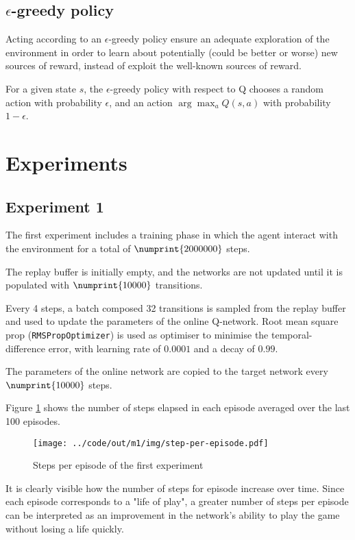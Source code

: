 \documentclass[a4paper,12pt]{article} %
\begin{document}
	\subsection*{$\epsilon$-greedy policy}
	
	Acting according to an $\epsilon$-greedy policy ensure an adequate exploration of the environment in order to learn about potentially (could be better or worse) new sources of reward, instead of exploit the well-known sources of reward.
	
	For a given state $s$, the $\epsilon$-greedy policy with respect to Q chooses a random action with probability $\epsilon$, and an action $\arg \max_a Q(s, a)$ with probability $1 - \epsilon$.
	
	\section{Experiments}
	\subsection*{Experiment 1}
	The first experiment includes a training phase in which the agent interact with the environment for a total of $\numprint{2000000}$ steps.
	
	The replay buffer is initially empty, and the networks are not updated until it is populated with $\numprint{10000}$ transitions. 
	
	Every 4 steps, a batch composed 32 transitions is sampled from the replay buffer and used to update the parameters of the online Q-network.
	Root mean square prop (\texttt{RMSPropOptimizer}) is used as optimiser to minimise the temporal-difference error, with learning rate of ${0.0001}$ and a decay of $0.99$. 
	
	The parameters of the online network are copied to the target network every $\numprint{10000}$ steps.
	\bigskip

	Figure \ref{fig:step-m1} shows the number of steps elapsed in each episode averaged over the last 100 episodes.
	\begin{figure}[htb]
		\centering
		\texttt{[image: ../code/out/m1/img/step-per-episode.pdf]}	
		\caption{Steps per episode of the first experiment}
		\label{fig:step-m1}
	\end{figure}

	It is clearly visible how the number of steps for episode increase over time. Since each episode corresponds to a "life of play", a greater number of steps per episode can be interpreted as an improvement in the network's ability to play the game without losing a life quickly. 
	\bigskip
	
\end{document}
